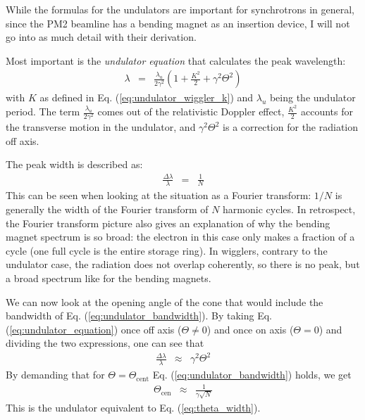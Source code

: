 \documentclass[a4paper,10pt]{article}
\begin{document}
    While the formulas for the undulators are important for synchrotrons in
general, since the PM2 beamline has a bending magnet as an insertion device, I
will not go into as much detail with their derivation.

    Most important is the \emph{undulator equation} that calculates the peak
wavelength:
    \begin{eqnarray}
      \lambda &=&\frac{\lambda_u}{2 \gamma^2} 
                 \left(
                   1 + \frac{K^2}{2} + \gamma^2 \Theta^2
                 \right) \label{eq:undulator_equation}
    \end{eqnarray}
with $K$ as defined in Eq. (\ref{eq:undulator_wiggler_k}) and $\lambda_u$ being
the undulator period. The term $\frac{\lambda_u}{2 \gamma^2}$ comes out of the
relativistic Doppler effect, $\frac{K^2}{2}$ accounts for the transverse
motion in the undulator, and $\gamma^2 \Theta^2$ is a correction for the
radiation off axis.

    The peak width is described as:
\begin{eqnarray}
  \frac{\Delta \lambda}{\lambda} &=& \frac{1}{N} \label{eq:undulator_bandwidth}
\end{eqnarray}
This can be seen when looking at the situation as a Fourier transform: $1/N$ is
generally the width of the Fourier transform of $N$ harmonic cycles. In
retrospect, the Fourier transform picture also gives an explanation of why the
bending magnet spectrum is so broad: the electron in this case only makes a
fraction of a cycle (one full cycle is the entire storage ring). In wigglers,
contrary to the undulator case, the radiation does not overlap coherently, so
there is no peak, but a broad spectrum like for the bending magnets.

    We can now look at the opening angle of the cone that would include the
bandwidth of Eq. (\ref{eq:undulator_bandwidth}). By taking Eq.
(\ref{eq:undulator_equation}) once off axis ($\Theta \neq 0$)  and once on
axis ($\Theta = 0$) and dividing the two expressions, one can see that
\begin{eqnarray}
  \frac{\Delta \lambda}{\lambda} &\approx& \gamma^2 \Theta^2
\end{eqnarray}
By demanding that for $\Theta = \Theta_{\text{cent}}$ Eq.
(\ref{eq:undulator_bandwidth}) holds, we get
\begin{eqnarray}
    \Theta_\text{cen} &\approx& \frac{1}{\gamma\sqrt{N}}
\end{eqnarray}
This is the undulator equivalent to Eq. (\ref{eq:theta_width}).
\end{document}
